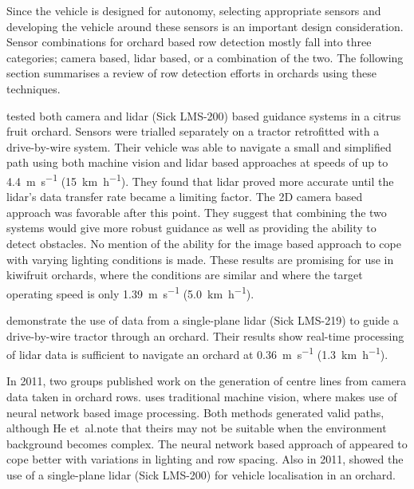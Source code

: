 \documentclass[preprint,authoryear,12pt]{elsarticle}
\begin{document}
        Since the vehicle is designed for autonomy, selecting appropriate sensors and developing the vehicle around these sensors is an important design consideration.
        Sensor combinations for orchard based row detection mostly fall into three categories; camera based, lidar based, or a combination of the two.
        The following section summarises a review of row detection efforts in orchards using these techniques.


        \cite{Subramanian2006} tested both camera and lidar (Sick LMS-200) based guidance systems in a citrus fruit orchard.
        Sensors were trialled separately on a tractor retrofitted with a drive-by-wire system.
        Their vehicle was able to navigate a small and simplified path using both machine vision and lidar based approaches at speeds of up to \SI{4.4}{\meter\per\second} (\SI{15}{\kilo\meter\per\hour}).
        They found that lidar proved more accurate until the lidar's data transfer rate became a limiting factor.
        The 2D camera based approach was favorable after this point.
        They suggest that combining the two systems would give more robust guidance as well as providing the ability to detect obstacles.
        No mention of the ability for the image based approach to cope with varying lighting conditions is made.
        These results are promising for use in kiwifruit orchards, where the conditions are similar and where the target operating speed is only \SI{1.39}{\meter\per\second} (\SI{5.0}{\kilo\meter\per\hour}).

        \cite{Barawid2007} demonstrate the use of data from a single-plane lidar (Sick LMS-219) to guide a drive-by-wire tractor through an orchard.
        Their results show real-time processing of lidar data is sufficient to navigate an orchard at \SI{0.36}{\meter\per\second} (\SI{1.3}{\kilo\meter\per\hour}).

        In 2011, two groups published work on the generation of centre lines from camera data taken in orchard rows.
        \cite{He2011} uses traditional machine vision, where \cite{Torres2011} makes use of neural network based image processing.
        Both methods generated valid paths, although He et~al.\@ note that theirs may not be suitable when the environment background becomes complex.
        The neural network based approach of \cite{Torres2011} appeared to cope better with variations in lighting and row spacing.
        Also in 2011, \cite{Hansen2011} showed the use of a single-plane lidar (Sick LMS-200) for vehicle localisation in an orchard.
\end{document}
